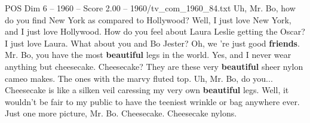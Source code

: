 \begin{textsample}{POS Dim 6 – 1960 – Score 2.00 – 1960/tv\_com\_1960\_84.txt}  \label{ex:f6_pos_022}
Uh, Mr.
Bo, how do you find New York as compared to Hollywood?
Well, I just love New York, and I just love Hollywood.
How do you feel about Laura Leslie getting the Oscar?
I just love Laura.
What about you and Bo Jester?
Oh, we 're just good \textbf{friends}.
Mr.
Bo, you have the most \textbf{beautiful} legs in the world.
Yes, and I never wear anything but cheesecake.
Cheesecake?
They are these very \textbf{beautiful} sheer nylon cameo makes.
The ones with the marvy fluted top.
Uh, Mr.
Bo, do you...
Cheesecake is like a silken veil caressing my very own \textbf{beautiful} legs.
Well, it wouldn't be fair to my public to have the teeniest wrinkle or bag anywhere ever.
Just one more picture, Mr.
Bo.
Cheesecake.
Cheesecake nylons.

\end{textsample}
